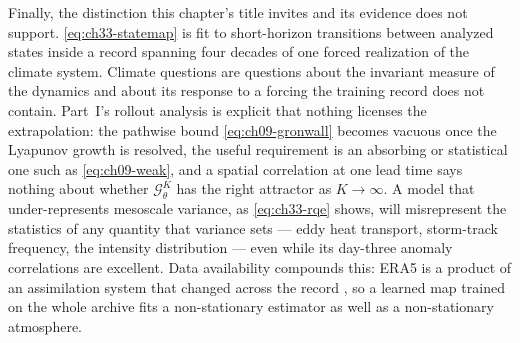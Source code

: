 Finally, the distinction this chapter's title invites and its evidence does not support.
\eqref{eq:ch33-statemap} is fit to short-horizon transitions between analyzed states inside
a record spanning four decades of one forced realization of the climate system. Climate
questions are questions about the invariant measure of the dynamics and about its response
to a forcing the training record does not contain. Part~I's rollout analysis is explicit
that nothing licenses the extrapolation: the pathwise bound \eqref{eq:ch09-gronwall}
becomes vacuous once the Lyapunov growth is resolved, the useful requirement is an
absorbing or statistical one such as \eqref{eq:ch09-weak}, and a spatial correlation at one
lead time says nothing about whether $\mathcal{G}_{\theta}^{K}$ has the right attractor as
$K \to \infty$. A model that under-represents mesoscale
variance, as \eqref{eq:ch33-rqe} shows, will misrepresent the statistics of any quantity
that variance sets --- eddy heat transport, storm-track frequency, the intensity
distribution --- even while its day-three anomaly correlations are excellent. Data
availability compounds this: ERA5 is a product of an assimilation system that changed
across the record \cite{hersbach2020era5}, so a learned map trained on the whole archive fits a non-stationary
estimator as well as a non-stationary atmosphere. 



